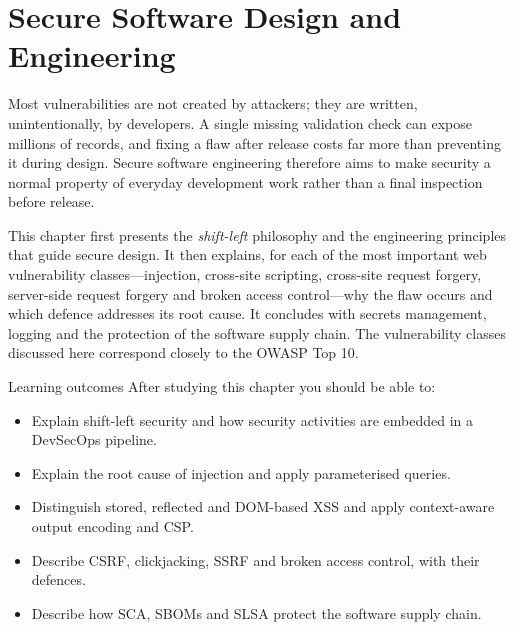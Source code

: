 \chapter{Secure Software Design and Engineering}\label{ch:9}

Most vulnerabilities are not created by attackers; they are written, unintentionally, by developers. A single missing validation check can expose millions of records, and fixing a flaw after release costs far more than preventing it during design. Secure software engineering therefore aims to make security a normal property of everyday development work rather than a final inspection before release.

This chapter first presents the \emph{shift-left} philosophy and the engineering principles that guide secure design. It then explains, for each of the most important web vulnerability classes—injection, cross-site scripting, cross-site request forgery, server-side request forgery and broken access control—why the flaw occurs and which defence addresses its root cause. It concludes with secrets management, logging and the protection of the software supply chain. The vulnerability classes discussed here correspond closely to the OWASP Top 10.

\begin{outcomesbox}{Learning outcomes}
After studying this chapter you should be able to:
\begin{itemize}
  \item Explain shift-left security and how security activities are embedded in a DevSecOps pipeline.
  \item Explain the root cause of injection and apply parameterised queries.
  \item Distinguish stored, reflected and DOM-based XSS and apply context-aware output encoding and CSP.
  \item Describe CSRF, clickjacking, SSRF and broken access control, with their defences.
  \item Describe how SCA, SBOMs and SLSA protect the software supply chain.
\end{itemize}
\end{outcomesbox}

